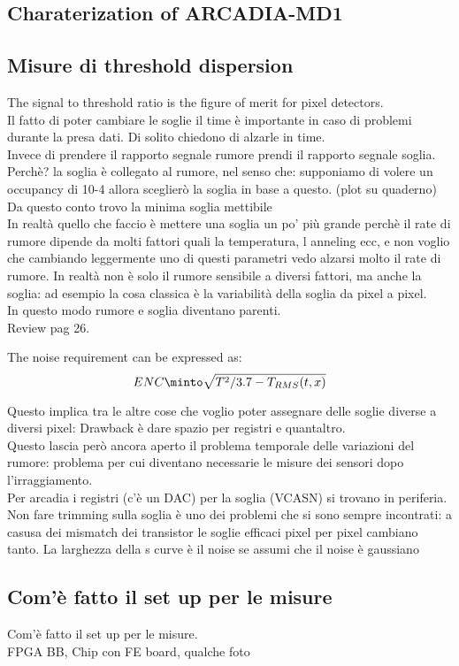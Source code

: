 \label{threshold_noise}
\begin{titlepage}

\section{Charaterization of ARCADIA-MD1}


\subsection{Misure di threshold dispersion }
The signal to threshold ratio is the figure of merit for pixel detectors.\\

Il fatto di poter cambiare le soglie il time è importante in caso di problemi durante
la presa dati. Di solito chiedono di alzarle in time.\\

Invece di prendere il rapporto segnale rumore prendi il rapporto segnale soglia. Perchè?
la soglia è collegato al rumore, nel senso che: supponiamo di volere un occupancy di 10-4
allora sceglierò la soglia in base a questo. (plot su quaderno)
Da questo conto trovo la minima soglia mettibile\\
In realtà quello che faccio è mettere una soglia un po' più grande perchè il rate di rumore
dipende da molti fattori quali la temperatura, l anneling ecc, e non voglio che cambiando leggermente
uno di questi parametri vedo alzarsi molto il rate di rumore. In realtà non è solo il
rumore sensibile a diversi fattori, ma anche la soglia: ad esempio la cosa classica è
la variabilità della soglia da pixel a pixel.\\
In questo modo rumore e soglia diventano parenti.\\
Review pag 26.

The noise requirement can be expressed as:
\begin{equation}
ENC \minto \sqrt{T^{2} /3.7 - T_{RMS}(t, x)}
\end{equation}

Questo implica tra le altre cose che voglio poter assegnare delle soglie diverse
a diversi pixel: Drawback è dare spazio per registri e quantaltro.\\
Questo lascia però ancora aperto il problema temporale delle variazioni del rumore:
problema per cui diventano necessarie le misure dei sensori dopo l'irraggiamento.\\


Per arcadia i registri (c'è un DAC) per la soglia (VCASN) si trovano in periferia.
Non fare trimming sulla soglia è uno dei problemi che si sono sempre incontrati: a casusa dei mismatch dei transistor
le soglie efficaci pixel per pixel cambiano tanto.
La larghezza della s curve è il noise se assumi che il noise è gaussiano

\subsection{Com'è fatto il set up per le misure}
Com'è fatto il set up per le misure.\\
FPGA BB, Chip con FE board, qualche foto\\
\end{titlepage}
